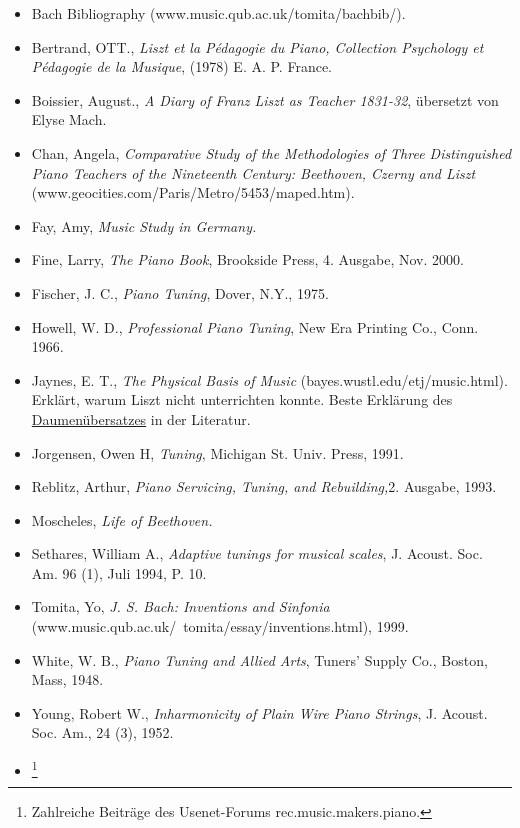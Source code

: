\begin{itemize} 
 \item Bach Bibliography (www.music.qub.ac.uk/tomita/bachbib/).
 \item Bertrand, OTT., \textit{Liszt et la Pédagogie du Piano, Collection Psychology et Pédagogie de la Musique}, (1978) E. A. P. France.
 \item Boissier, August., \textit{A Diary of Franz Liszt as Teacher 1831-32}, übersetzt von Elyse Mach.
 \item Chan, Angela, \textit{Comparative Study of the Methodologies of Three Distinguished Piano Teachers of the Nineteenth Century: Beethoven, Czerny and Liszt} (www.geocities.com/Paris/Metro/5453/maped.htm).
 \item Fay, Amy, \textit{Music Study in Germany.}
 \item Fine, Larry, \textit{The Piano Book}, Brookside Press, 4. Ausgabe, Nov. 2000.
 \item Fischer, J. C., \textit{Piano Tuning}, Dover, N.Y., 1975.
 \item Howell, W. D., \textit{Professional Piano Tuning}, New Era Printing Co., Conn. 1966.
 \item Jaynes, E. T., \textit{The Physical Basis of Music} (bayes.wustl.edu/etj/music.html).
Erklärt, warum Liszt nicht unterrichten konnte.
Beste Erklärung des \hyperref[c1iii5a]{Daumenübersatzes} in der 
Literatur.
 \item Jorgensen, Owen H, \textit{Tuning}, Michigan St. Univ. Press, 1991.
 \item Reblitz, Arthur, \textit{Piano Servicing, Tuning, and Rebuilding,}2. Ausgabe, 1993.
 \item Moscheles, \textit{Life of Beethoven.}
 \item Sethares, William A., \textit{Adaptive tunings for musical scales}, J. Acoust. Soc. Am. 96 (1), Juli 1994, P. 10.
 \item Tomita, Yo, \textit{J. S. Bach: Inventions and Sinfonia} (www.music.qub.ac.uk/~tomita/essay/inventions.html), 1999.
 \item White, W. B., \textit{Piano Tuning and Allied Arts}, Tuners' Supply Co., Boston, Mass, 1948.
 \item Young, Robert W., \textit{Inharmonicity of Plain Wire Piano Strings}, J. Acoust. Soc. Am., 24 (3), 1952.
 \item \footnote{Zahlreiche Beiträge des Usenet-Forums rec.music.makers.piano.}
 \end{itemize}

